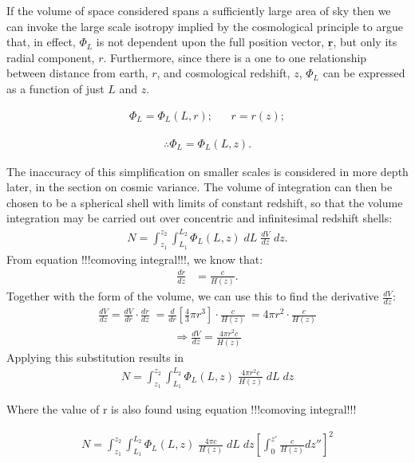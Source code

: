 \documentclass[pdf,color]{UoBnote}
\begin{document}
If the volume of space considered spans a sufficiently large area of sky then we can invoke the large scale isotropy implied by the cosmological principle to argue that, in effect, $\Phi_L$ is not dependent upon the full position vector, $\underline{\mathbf{r}}$, but only its radial component, $r$. Furthermore, since there is a one to one relationship between distance from earth, $r$, and cosmological redshift, $z$, $\Phi_L$ can be expressed as a function of just $L$ and $z$.

\begin{align}	
			\Phi_L = \Phi_L(L,r);	&&	 r= r(z); 		
\end{align}

\begin{align}
			\therefore	\Phi_L = \Phi_L(L,z).	
\end{align}

The inaccuracy of this simplification on smaller scales is considered in more depth later, in the section on cosmic variance.
The volume of integration can then be chosen to be a spherical shell with limits of constant redshift, so that the volume integration may be carried out over concentric and infinitesimal redshift shells:
\begin{align}
			N = \int_{z_1}^{z_2}  { \int_{L_1}^{L_2} { \Phi_L(L,z) \; dL } \;  \frac{dV}{dz} \; dz }.
\end{align}
From equation !!!comoving integral!!!, we know that:
\begin{align} 
		 	\frac{dr}{dz} &= \frac{c}{H(z)}. 
\end{align}
Together with the form of the volume, we can use this to find the derivative $\frac{dV}{dz}$:
\begin{align}	
					\frac{dV}{dz}  	= \frac{dV}{dr} \cdot \frac{dr}{dz} \;  
 				= \frac{d}{dr} \left[\frac{4}{3} \pi r^3 \right ] \cdot \frac{c}{H(z)} \
				= 4 \pi r^2 \cdot \frac{c}{H(z)} 
\end{align}	
\begin{align}	
			\Rightarrow	\frac{dV}{dz}	= \frac{4 \pi r^2 c}{H(z)}			
\end{align}
Applying this substitution results in 
\begin{align}
			N = \int_{z_1}^{z_2}  { \int_{L_1}^{L_2} { \Phi_L(L,z)  \;  \frac{4 \pi r^2 c}{H(z)} \;  dL \; dz } }
\end{align}

Where the value of r is also found using equation !!!comoving integral!!!

\begin{align}
			N = \int_{z_1}^{z_2}  { \int_{L_1}^{L_2} { \Phi_L(L,z)  \;  \frac{4 \pi c}{H(z)} \;  dL \; dz \left[ \int_0^{z'}{\frac{c }{H(z)} dz'' }\right ]^2} }
\end{align}
\end{document}
